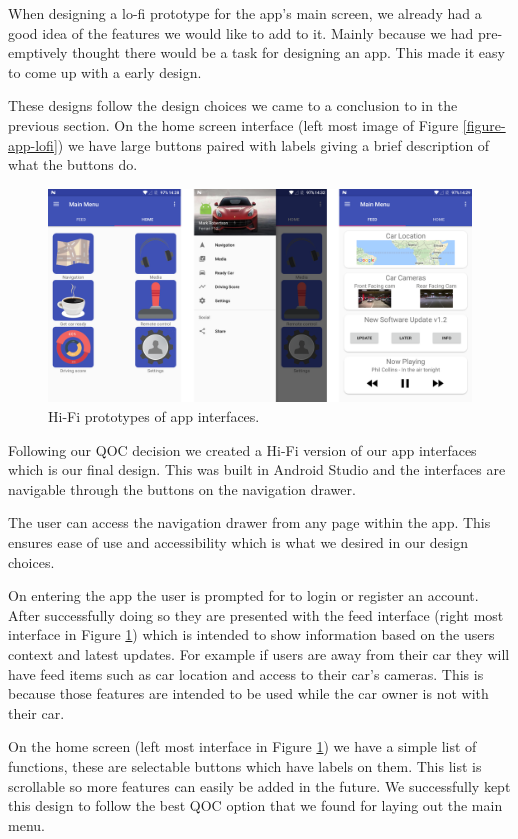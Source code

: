 \documentclass{article}
\begin{document}
When designing a lo-fi prototype for the app's main screen, we already had a good idea of the features we would like to add to it. Mainly because we had pre-emptively thought there would be a task for designing an app. This made it easy to come up with a early design.

These designs follow the design choices we came to a conclusion to in the previous section. On the home screen interface (left most image of Figure \ref{figure-app-lofi}) we have large buttons paired with labels giving a brief description of what the buttons do.  

\begin{figure}[H]
  \centering
  \includegraphics[width=\textwidth]{app-hifi}
  \caption{Hi-Fi prototypes of app interfaces.}\label{figure-app-hifi}
\end{figure}
Following our QOC decision we created a Hi-Fi version of our app interfaces which is our final design. This was built in Android Studio and the interfaces are navigable through the buttons on the navigation drawer.

The user can access the navigation drawer from any page within the app. This ensures ease of use and accessibility which is what we desired in our design choices.

On entering the app the user is prompted for to login or register an account. After successfully doing so they are presented with the feed interface (right most interface in Figure \ref{figure-app-hifi}) which is intended to show information based on the users context and latest updates. For example if users are away from their car they will have feed items such as car location and access to their car's cameras. This is because those features are intended to be used while the car owner is not with their car.

On the home screen (left most interface in Figure \ref{figure-app-hifi}) we have a simple list of functions, these are selectable buttons which have labels on them. This list is scrollable so more features can easily be added in the future. We successfully kept this design to follow the best QOC option that we found for laying out the main menu.
\end{document}
